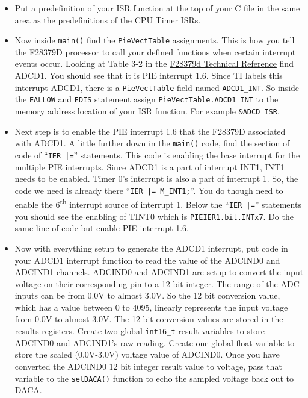\documentclass[11pt]{article}
\begin{document}
\begin{enumerate}
\begin{itemize}
\begin{verbatim}
}
\end{verbatim}
            \item Put a predefinition of your ISR function at the top of your C file in the same area as the predefinitions of the CPU Timer ISRs.
                \item Now inside \texttt{main()} find the \texttt{PieVectTable} assignments. This is how you tell the F28379D processor to call your defined functions when certain interrupt events occur. Looking at Table 3-2 in the \href{http://coecsl.ece.illinois.edu/se423/PeripheralInterruptChannelMapTable.pdf}{F28379d Technical Reference} find ADCD1. You should see that it is PIE interrupt 1.6. Since TI labels this interrupt ADCD1, there is a \texttt{PieVectTable} field named \texttt{ADCD1_INT}. So inside the \texttt{EALLOW} and \texttt{EDIS} statement assign \texttt{PieVectTable.ADCD1_INT} to the memory address location of your ISR function. For example \texttt{&ADCD_ISR}.
                \item Next step is to enable the PIE interrupt 1.6 that the F28379D associated with ADCD1. A little further down in the \texttt{main()} code, find the section of code of “\texttt{IER |=}” statements. This code is enabling the base interrupt for the multiple PIE interrupts. Since ADCD1 is a part of interrupt INT1, INT1 needs to be enabled. Timer 0’s interrupt is also a part of interrupt 1. So, the code we need is already there “\texttt{IER |= M_INT1;}”. You do though need to enable the 6\textsuperscript{th} interrupt source of interrupt 1. Below the “\texttt{IER |=}” statements you should see the enabling of TINT0 which is \texttt{PIEIER1.bit.INTx7}. Do the same line of code but enable PIE interrupt 1.6.
                \item Now with everything setup to generate the ADCD1 interrupt, put code in your ADCD1 interrupt function to read the value of the ADCIND0 and ADCIND1 channels. ADCIND0 and ADCIND1 are setup to convert the input voltage on their corresponding pin to a 12 bit integer. The range of the ADC inputs can be from 0.0V to almost 3.0V. So the 12 bit conversion value, which has a value between 0 to 4095, linearly represents the input voltage from 0.0V to almost 3.0V. The 12 bit conversion values are stored in the results registers. Create two global \texttt{int16_t} result variables to store ADCIND0 and ADCIND1’s raw reading. Create one global float variable to store the scaled (0.0V-3.0V) voltage value of ADCIND0. Once you have converted the ADCIND0 12 bit integer result value to voltage, pass that variable to the \texttt{setDACA()} function to echo the sampled voltage back out to DACA.

\end{itemize}
\end{enumerate}
\end{document}
